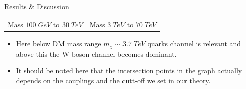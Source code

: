\documentclass[11pt]{beamer}
\begin{document}
\begin{frame}{Results \& Discussion}
\begin{small}
\begin{itemize}
\begin{tabular}{cc}
Mass $100\; GeV$ to $30\; TeV$ & Mass $3\; TeV$ to $70\; TeV$ 
\end{tabular}


\end{itemize}

\end{small}

\vspace{-4mm}
\begin{small}
\begin{itemize}
\item Here below DM mass range $m_\chi \sim 3.7 \;TeV$ quarks channel is relevant and above this the W-boson channel becomes dominant. 
\vspace{-1.5mm}
\item It should be noted here
that the intersection points in the graph actually depends on the couplings and the cutt-off we set in our
theory. 

\end{itemize}
\end{small}

\end{frame}
\end{document}
